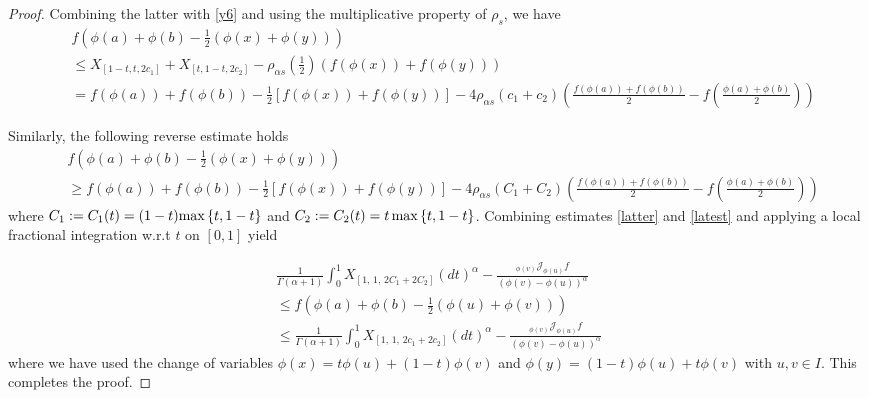 \documentclass[10pt]{article}
\begin{document}
\begin{proof}
Combining the latter  with \eqref{y6} and using the multiplicative property of $\rho_s$, we have
\begin{align}
&f\left( \phi(a) +\phi(b) -\frac{1}{2}(\phi(x)+\phi(y) )  \right)  \nonumber
\\&\leq   X_{[1-t,t,2c_1]} +X_{[t,1-t,2c_2]}-\rho_{\alpha s} \left( \frac{1}{2}\right)(f(\phi(x))+ f(\phi(y)))  \nonumber
\\& =f(\phi(a)) +f(\phi(b)) -\frac{1}{2}[f(\phi(x))+f(\phi(y))] -4\rho_{\alpha s}(c_1+c_2)\left(\frac{f(\phi(a))+f(\phi(b))}{2} -f\left( \frac{\phi(a)+\phi(b)}{2} \right)  \right)
\label{latter}
\end{align}

Similarly, the following reverse estimate holds
 \begin{align}
&f\left( \phi(a) +\phi(b) -\frac{1}{2}(\phi(x)+\phi(y) )  \right)  \nonumber
\\&\geq f(\phi(a)) +f(\phi(b)) -\frac{1}{2}[f(\phi(x))+f(\phi(y))] -4\rho_{\alpha s}(C_1+C_2)\left(\frac{f(\phi(a))+f(\phi(b))}{2} -f\left( \frac{\phi(a)+\phi(b)}{2} \right)  \right)  \label{latest}
\end{align}
where $C_1:=C_1(t)=(1-t)\textnormal{max}\left\{t, 1-t   \right\}$ and $C_2:=C_2(t)=t\,\textnormal{max}\left\{t, 1-t   \right\} $.
Combining estimates \eqref{latter} and \eqref{latest} and applying a local fractional integration  w.r.t $t$ on $[0,1]$ yield

\begin{align}
&\frac{1}{\Gamma(\alpha +1)}\int_0^1 X_{[1,\, 1,\, 2C_1+2C_2]}(dt)^\alpha -\frac{{}_{\phi(v)}\mathcal{J}_{\phi(u)}f}{(\phi(v)-\phi(u))^\alpha}\,\,\,\,  \nonumber
\\&\leq f\left( \phi(a) +\phi(b) -\frac{1}{2}(\phi(u)+\phi(v) )  \right)  \nonumber
\\&\leq \frac{1}{\Gamma(\alpha +1)}\int_0^1 X_{[1,\, 1,\, 2c_1+2c_2]}(dt)^\alpha -\frac{{}_{\phi(v)}\mathcal{J}_{\phi(u)}f}{(\phi(v)-\phi(u))^\alpha}\,\,\,\,  \nonumber
\end{align}
where we have used the change of variables $\phi(x)=t\phi(u)+(1-t)\phi(v)$ and $\phi(y)=(1-t)\phi(u)+t\phi(v)$ with $u,v\in I$. This completes the proof.
\end{proof}
\end{document}
